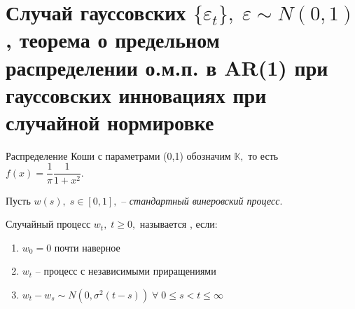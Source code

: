 \section{Случай гауссовских $ \lbrace \varepsilon_t \rbrace, \; \varepsilon \sim N(0, 1) $, теорема о предельном распределении о.м.п. в AR(1) при гауссовских инновациях при случайной нормировке}\label{lec:11/sec:2}

Распределение Коши с параметрами (0,1) обозначим $ \mathbb{K},  $ то есть $ f(x) = \dfrac{1}{\pi}\dfrac{1}{1 + x^2}. $

Пусть $ w(s), \; s \in [0, 1], $ -- \textit{стандартный винеровский процесс}.

\begin{remem}
    \begin{definition}
        Случайный процесс $ w_t, \; t \geq 0, $ называется , если:
        \begin{enumerate}
            \item $ w_0 = 0 $ почти наверное
            \item $ w_t $ -- процесс с независимыми приращениями
            \item $ w_t - w_s \sim N(0, \sigma^2(t - s)) \; \forall \; 0 \leq s < t \leq \infty $
        \end{enumerate}
    \end{definition}
\end{remem}\vspace{0.5cm}


